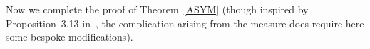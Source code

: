 \documentclass[12pt,a4paper,intlimits,sumlimits]{amsart}
\def \R {\mathbb{R}}
\def \Ns {\mathscr{N}_{s}}
\theoremstyle{definition}
\theoremstyle{plain}
\numberwithin{equation}{section}
\begin{document}
%
%

Now we complete the proof of Theorem~\ref{ASYM}
(though inspired by Proposition~3.13 
in~\cite{MR3651008}, the complication arising from the measure does require here some bespoke modifications).
\end{document}
